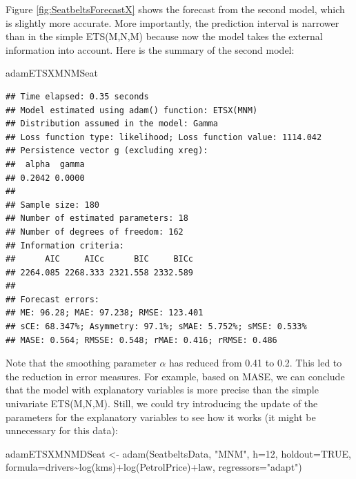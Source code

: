 \documentclass[
]{book}
\newenvironment{Shaded}{\begin{snugshade}}{\end{snugshade}}
\newcommand{\AttributeTok}[1]{\textcolor[rgb]{0.77,0.63,0.00}{#1}}
\newcommand{\ConstantTok}[1]{\textcolor[rgb]{0.00,0.00,0.00}{#1}}
\newcommand{\DecValTok}[1]{\textcolor[rgb]{0.00,0.00,0.81}{#1}}
\newcommand{\FunctionTok}[1]{\textcolor[rgb]{0.00,0.00,0.00}{#1}}
\newcommand{\NormalTok}[1]{#1}
\newcommand{\OtherTok}[1]{\textcolor[rgb]{0.56,0.35,0.01}{#1}}
\newcommand{\SpecialCharTok}[1]{\textcolor[rgb]{0.00,0.00,0.00}{#1}}
\newcommand{\StringTok}[1]{\textcolor[rgb]{0.31,0.60,0.02}{#1}}
\theoremstyle{definition}
\theoremstyle{definition}
\theoremstyle{definition}
\theoremstyle{definition}
\theoremstyle{remark}
\begin{document}
Figure \ref{fig:SeatbeltsForecastX} shows the forecast from the second model, which is slightly more accurate. More importantly, the prediction interval is narrower than in the simple ETS(M,N,M) because now the model takes the external information into account. Here is the summary of the second model:

\begin{Shaded}
\begin{Highlighting}[]
\NormalTok{adamETSXMNMSeat}
\end{Highlighting}
\end{Shaded}

\begin{verbatim}
## Time elapsed: 0.35 seconds
## Model estimated using adam() function: ETSX(MNM)
## Distribution assumed in the model: Gamma
## Loss function type: likelihood; Loss function value: 1114.042
## Persistence vector g (excluding xreg):
##  alpha  gamma 
## 0.2042 0.0000 
## 
## Sample size: 180
## Number of estimated parameters: 18
## Number of degrees of freedom: 162
## Information criteria:
##      AIC     AICc      BIC     BICc 
## 2264.085 2268.333 2321.558 2332.589 
## 
## Forecast errors:
## ME: 96.28; MAE: 97.238; RMSE: 123.401
## sCE: 68.347%; Asymmetry: 97.1%; sMAE: 5.752%; sMSE: 0.533%
## MASE: 0.564; RMSSE: 0.548; rMAE: 0.416; rRMSE: 0.486
\end{verbatim}

Note that the smoothing parameter \(\alpha\) has reduced from 0.41 to 0.2. This led to the reduction in error measures. For example, based on MASE, we can conclude that the model with explanatory variables is more precise than the simple univariate ETS(M,N,M). Still, we could try introducing the update of the parameters for the explanatory variables to see how it works (it might be unnecessary for this data):

\begin{Shaded}
\begin{Highlighting}[]
\NormalTok{adamETSXMNMDSeat }\OtherTok{\textless{}{-}} \FunctionTok{adam}\NormalTok{(SeatbeltsData, }\StringTok{"MNM"}\NormalTok{, }\AttributeTok{h=}\DecValTok{12}\NormalTok{, }\AttributeTok{holdout=}\ConstantTok{TRUE}\NormalTok{,}
                         \AttributeTok{formula=}\NormalTok{drivers}\SpecialCharTok{\textasciitilde{}}\FunctionTok{log}\NormalTok{(kms)}\SpecialCharTok{+}\FunctionTok{log}\NormalTok{(PetrolPrice)}\SpecialCharTok{+}\NormalTok{law,}
                         \AttributeTok{regressors=}\StringTok{"adapt"}\NormalTok{)}
\end{Highlighting}
\end{Shaded}
\end{document}
